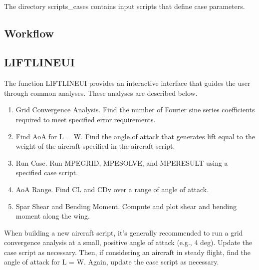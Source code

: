 \documentclass{article}
\begin{document}
\paragraph{}
The directory scripts\_cases contains input scripts that define case
parameters.
\subsection{Workflow}
\subsection{LIFTLINEUI}
The function LIFTLINEUI provides an interactive interface that guides
the user through common analyses.  These analyses are described below.
\begin{enumerate}
  \item Grid Convergence Analysis.  Find the number of Fourier sine
    series coefficients required to meet specified error requirements.
  \item Find AoA for L = W.  Find the angle of attack that generates
    lift equal to the weight of the aircraft specified in the
    aircraft script.
  \item Run Case.  Run MPEGRID, MPESOLVE, and MPERESULT using a
    specified case script.
  \item AoA Range.  Find CL and CDv over a range of angle of
    attack.
  \item Spar Shear and Bending Moment.  Compute and plot shear and
    bending moment along the wing.
\end{enumerate}
When building a new aircraft script, it's generally recommended to run
a grid convergence analysis at a small, positive angle of attack
(e.g., 4 deg).  Update the case script as necessary.  Then, if
considering an aircraft in steady flight, find the angle of attack for
L = W.  Again, update the case script as necessary.
\end{document}
